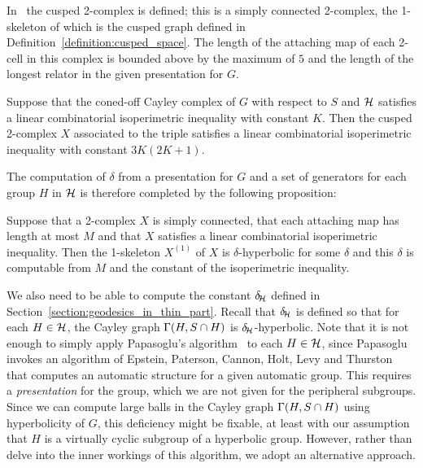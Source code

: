 In~\cite{grovesmanning08} the cusped 2-complex is defined; this is a simply connected 2-complex, the 1-skeleton of which is the cusped graph defined in Definition~\ref{definition:cusped_space}. 
The length of the attaching map of each 2-cell in this complex is bounded above by the maximum of $5$ and the length of the longest relator in the given presentation for $G$.

\begin{theorem}\cite[Theorem 3.24]{grovesmanning08}\label{thm:cuspedtwocomplex}
 Suppose that the coned-off Cayley complex of $G$ with respect to $S$ and $\mathcal{H}$ satisfies a linear combinatorial isoperimetric inequality with constant $K$. 
 Then the cusped 2-complex $X$ associated to the triple satisfies a linear combinatorial isoperimetric inequality with constant $3K(2K + 1)$.
\end{theorem}

The computation of $\delta$ from a presentation for $G$ and a set of generators for each group $H$ in $\mathcal{H}$ is therefore completed by the following proposition:

\begin{proposition}\cite[Proposition 2.23]{grovesmanning08}\label{prop:linearimplieshyperbolic}
Suppose that a 2-complex $X$ is simply connected, that each attaching map has length at most $M$ and that $X$ satisfies a linear combinatorial isoperimetric inequality. 
Then the 1-skeleton $X^{(1)}$ of $X$ is $\delta$-hyperbolic for some $\delta$ and this $\delta$ is computable from $M$ and the constant of the isoperimetric inequality. 
\end{proposition}

We also need to be able to compute the constant $\delta\kern-2pt_{\mathcal{H}}$ defined in Section~\ref{section:geodesics_in_thin_part}.
Recall that $\delta\kern-2pt_{\mathcal{H}}$ is defined so that for each $H \in \mathcal{H}$, the Cayley graph $\operatorname{\Gamma}(H, S \cap H)$ is $\delta\kern-2pt_{\mathcal{H}}$-hyperbolic.
Note that it is not enough to simply apply Papasoglu's algorithm~\cite{papasoglu95} to each $H \in \mathcal{H}$, since Papasoglu invokes an algorithm of Epstein, Paterson, Cannon, Holt, Levy and Thurston~\cite[Theorem 5.2.4]{epstein92} that computes an automatic structure for a given automatic group. 
This requires a \emph{presentation} for the group, which we are not given for the peripheral subgroups. 
Since we can compute large balls in the Cayley graph $\operatorname{\Gamma}(H, S \cap H)$ using hyperbolicity of $G$, this deficiency might be fixable, at least with our assumption that $H$ is a virtually cyclic subgroup of a hyperbolic group.
However, rather than delve into the inner workings of this algorithm, we adopt an alternative approach. 

